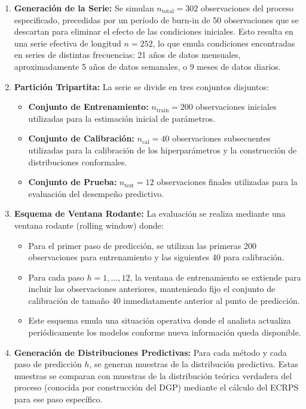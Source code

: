 \begin{enumerate}
\item \textbf{Generación de la Serie:} Se simulan $n_{\text{total}} = 302$ observaciones del proceso especificado, precedidas por un período de burn-in de 50 observaciones que se descartan para eliminar el efecto de las condiciones iniciales. Esto resulta en una serie efectiva de longitud $n = 252$, lo que emula condiciones 
encontradas en series de distintas frecuencias: 21 años de datos mensuales, 
aproximadamente 5 años de datos semanales, o 9 meses de datos diarios.

\item \textbf{Partición Tripartita:} La serie se divide en tres conjuntos disjuntos:
\begin{itemize}
\item \textbf{Conjunto de Entrenamiento:} $n_{\text{train}} = 200$ observaciones iniciales utilizadas para la estimación inicial de parámetros.
\item \textbf{Conjunto de Calibración:} $n_{\text{cal}} = 40$ observaciones subsecuentes utilizadas para la calibración de los hiperparámetros y la construcción de distribuciones conformales.
\item \textbf{Conjunto de Prueba:} $n_{\text{test}} = 12$ observaciones finales utilizadas para la evaluación del desempeño predictivo.
\end{itemize}

\item \textbf{Esquema de Ventana Rodante:} La evaluación se realiza mediante una ventana rodante (rolling window) donde:
\begin{itemize}
\item Para el primer paso de predicción, se utilizan las primeras 200 observaciones para entrenamiento y las siguientes 40 para calibración.
\item Para cada paso $h = 1, \ldots, 12$, la ventana de entrenamiento se extiende para incluir las observaciones anteriores, manteniendo fijo el conjunto de calibración de tamaño 40 inmediatamente anterior al punto de predicción.
\item Este esquema emula una situación operativa donde el analista actualiza periódicamente los modelos conforme nueva información queda disponible.
\end{itemize}

\item \textbf{Generación de Distribuciones Predictivas:} Para cada método y cada paso de predicción $h$, se generan muestras de la distribución predictiva. Estas muestras se comparan con muestras de la distribución teórica verdadera del proceso (conocida por construcción del DGP) mediante el cálculo del ECRPS para ese paso específico.


\end{enumerate}

